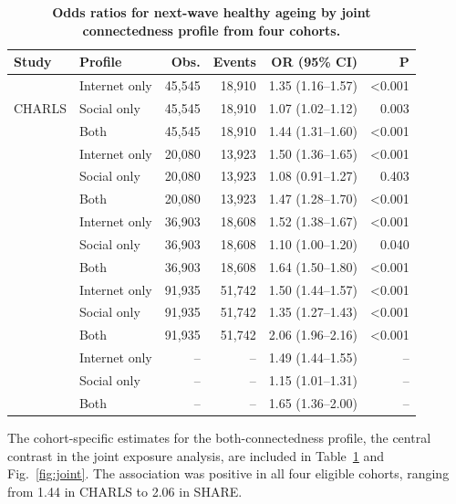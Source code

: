 \documentclass[pdflatex,sn-nature]{sn-jnl}
\begin{document}
\begin{table}[!htbp]
\caption{\textbf{Odds ratios for next-wave healthy ageing by joint connectedness profile from four cohorts.}}
\label{tab:joint}
\centering
\scriptsize
\setlength{\tabcolsep}{3pt}
\renewcommand{\arraystretch}{0.92}
\begin{tabular*}{\textwidth}{@{\extracolsep{\fill}}llrrrr@{}}
\toprule
Study & Profile & Obs. & Events & OR (95\% CI) & P \\
\midrule
\multirow{3}{*}{CHARLS}
& Internet only & 45,545 & 18,910 & 1.35 (1.16--1.57) & <0.001 \\
& Social only & 45,545 & 18,910 & 1.07 (1.02--1.12) & 0.003 \\
& Both & 45,545 & 18,910 & 1.44 (1.31--1.60) & <0.001 \\
\addlinespace
\multirow{3}{*}{ELSA}
& Internet only & 20,080 & 13,923 & 1.50 (1.36--1.65) & <0.001 \\
& Social only & 20,080 & 13,923 & 1.08 (0.91--1.27) & 0.403 \\
& Both & 20,080 & 13,923 & 1.47 (1.28--1.70) & <0.001 \\
\addlinespace
\multirow{3}{*}{HRS}
& Internet only & 36,903 & 18,608 & 1.52 (1.38--1.67) & <0.001 \\
& Social only & 36,903 & 18,608 & 1.10 (1.00--1.20) & 0.040 \\
& Both & 36,903 & 18,608 & 1.64 (1.50--1.80) & <0.001 \\
\addlinespace
\multirow{3}{*}{SHARE}
& Internet only & 91,935 & 51,742 & 1.50 (1.44--1.57) & <0.001 \\
& Social only & 91,935 & 51,742 & 1.35 (1.27--1.43) & <0.001 \\
& Both & 91,935 & 51,742 & 2.06 (1.96--2.16) & <0.001 \\
\addlinespace
\multirow{3}{*}{Random effects}
& Internet only & -- & -- & 1.49 (1.44--1.55) & -- \\
& Social only & -- & -- & 1.15 (1.01--1.31) & -- \\
& Both & -- & -- & 1.65 (1.36--2.00) & -- \\
\bottomrule
\end{tabular*}
\renewcommand{\arraystretch}{1.0}
\setlength{\tabcolsep}{6pt}
\end{table}
\FloatBarrier

The cohort-specific estimates for the both-connectedness profile, the central contrast in the joint exposure analysis, are included in Table~\ref{tab:joint} and Fig.~\ref{fig:joint}. The association was positive in all four eligible cohorts, ranging from 1.44 in CHARLS to 2.06 in SHARE.
\end{document}
